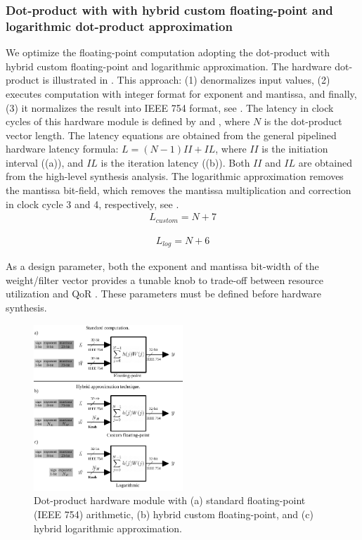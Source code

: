 \subsubsection{\textbf{Dot-product with with hybrid custom
		floating-point and logarithmic
		dot-product approximation}}
\label{sec:dot_product}
We optimize the floating-point computation adopting the dot-product with hybrid custom floating-point and logarithmic approximation\cite{nevarez2021accelerating}. The hardware dot-product is illustrated in . This approach: (1) denormalizes input values, (2) executes computation with integer format for exponent and mantissa, and finally, (3) it normalizes the result into IEEE 754 format, see . The latency in clock cycles of this hardware module is defined by  and , where $N$ is the dot-product vector length. The latency equations are obtained from the general pipelined hardware latency formula: $L=\left(N-1\right)II+IL$, where $II$ is the initiation interval ((a)), and $IL$ is the iteration latency ((b)). Both $II$ and $IL$ are obtained from the high-level synthesis analysis. The logarithmic approximation removes the mantissa bit-field, which removes the mantissa multiplication and correction in clock cycle 3 and 4, respectively, see .
\begin{eqnarray} \label{eq:dot_custom_float_latency}
L_{custom}=N+7
\end{eqnarray}

\begin{eqnarray} \label{eq:dot_log_latency}
L_{log}=N+6
\end{eqnarray}

 As a design parameter, both the exponent and mantissa bit-width of the weight/filter vector provides a tunable knob to trade-off between resource utilization and QoR \cite{park2009dynamic}. These parameters must be defined before hardware synthesis.

\begin{figure}[t!]
	\centering
	\includegraphics[width=0.5\textwidth]{../figures/dot-product_unit.pdf}
	\caption{Dot-product hardware module with (a) standard floating-point
		(IEEE 754) arithmetic, (b) hybrid custom floating-point, and (c) hybrid logarithmic approximation.}
	\label{fig:dot_product}
\end{figure}

